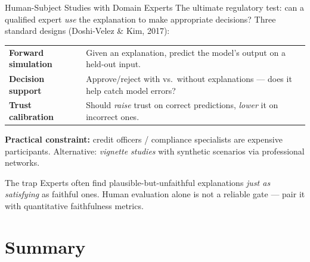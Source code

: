 \documentclass[9pt,t]{beamer}
\begin{document}
\begin{frame}{Human-Subject Studies with Domain Experts}
The ultimate regulatory test: can a qualified expert \emph{use} the explanation
to make appropriate decisions? Three standard designs (Doshi-Velez \& Kim, 2017):

\medskip
\begin{tabular}{p{3.0cm}p{7.2cm}}
\toprule
\textbf{Forward simulation} & Given an explanation, predict the model's output on
  a held-out input. \\[2pt]
\textbf{Decision support} & Approve/reject with vs.\ without explanations ---
  does it help catch model errors? \\[2pt]
\textbf{Trust calibration} & Should \emph{raise} trust on correct predictions,
  \emph{lower} it on incorrect ones. \\
\bottomrule
\end{tabular}

\medskip
\textbf{Practical constraint:} credit officers / compliance specialists are
expensive participants. Alternative: \emph{vignette studies} with synthetic
scenarios via professional networks.

\medskip
\begin{alertblock}{The trap}
Experts often find plausible-but-unfaithful explanations \emph{just as
satisfying} as faithful ones. Human evaluation alone is not a reliable gate ---
pair it with quantitative faithfulness metrics.
\end{alertblock}
\end{frame}

\section{Summary}
\end{document}
